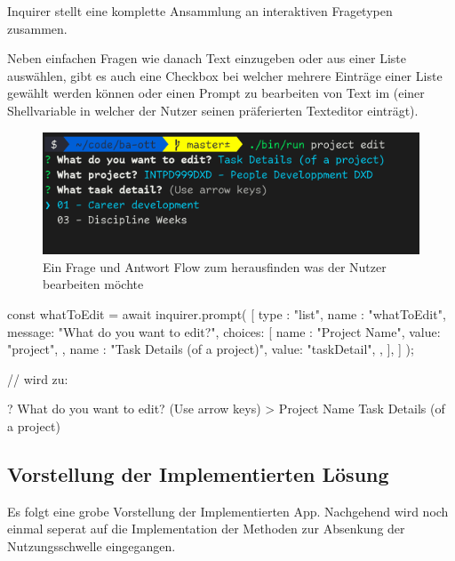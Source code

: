 \documentclass[oneside,bibliography=totocnumbered,BCOR=5mm]{scrbook}
\newenvironment{code}{\captionsetup{type=listing, skip=0pt}}{}
\begin{document}
Inquirer stellt eine komplette Ansammlung an interaktiven %
Fragetypen zusammen.

Neben einfachen Fragen wie danach Text einzugeben oder aus einer Liste
auswählen, gibt es auch eine Checkbox bei welcher mehrere Einträge einer
Liste gewählt werden können oder einen Prompt zu bearbeiten von Text im
 (einer Shellvariable in welcher der Nutzer seinen
präferierten Texteditor einträgt).

\begin{figure}
  \centering
  \includegraphics[scale=0.5]{inquirer-example.png}
  \caption{Ein Frage und Antwort Flow zum herausfinden was der Nutzer bearbeiten möchte}
  \label{fig:inquirer-example}
\end{figure}

\begin{code}
  \medskip
  \begin{javascriptcode}
const { whatToEdit } = await inquirer.prompt( [ {
  type   : "list",
  name   : "whatToEdit",
  message: "What do you want to edit?",
  choices: [
    {
      name : "Project Name",
      value: "project",
    },
    {
      name : "Task Details (of a project)",
      value: "taskDetail",
    },
  ],
} ] );

// wird zu:

? What do you want to edit? (Use arrow keys)
> Project Name
  Task Details (of a project)
  \end{javascriptcode}
\end{code}

\subsection{Vorstellung der Implementierten Lösung}


Es folgt eine grobe Vorstellung der Implementierten App. Nachgehend wird
noch einmal seperat auf die Implementation der Methoden zur Absenkung der
Nutzungsschwelle eingegangen.
\end{document}
